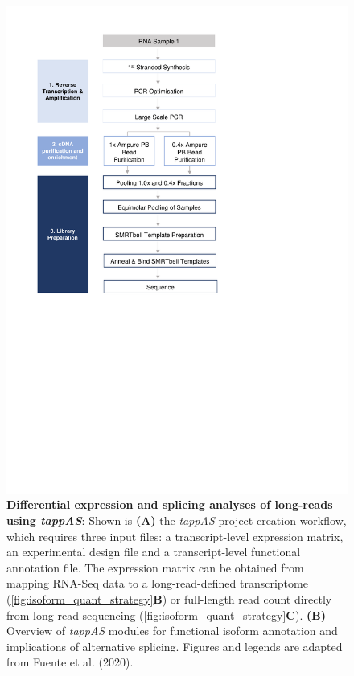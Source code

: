\begin{figure}[htp]
	\begin{center}
		\includegraphics[page=21,trim={0cm 5cm 0 0cm},clip, scale = 0.8]{Figures/ProjectDevelopment_Figures.pdf}
	\end{center}
	\captionsetup{width=0.95\textwidth,singlelinecheck=off}
	\caption[Differential expression and splicing analyses of long-reads using \textit{tappAS}]%
	{\textbf{Differential expression and splicing analyses of long-reads using \textit{tappAS}}: Shown is \textbf{(A)} the \textit{tappAS} project creation workflow, which requires three input files: a transcript-level expression matrix, an experimental design file and a transcript-level functional annotation file. The expression matrix can be obtained from mapping RNA-Seq data to a long-read-defined transcriptome (\cref{fig:isoform_quant_strategy}\textbf{B}) or full-length read count directly from long-read sequencing (\cref{fig:isoform_quant_strategy}\textbf{C}). \textbf{(B)} Overview of \textit{tappAS} modules for functional isoform annotation and implications of alternative splicing. Figures and legends are adapted from Fuente et al. (2020)\cite{DeLaFuente2020}.
	}
	\label{fig:tappAS_overview}
\end{figure}

